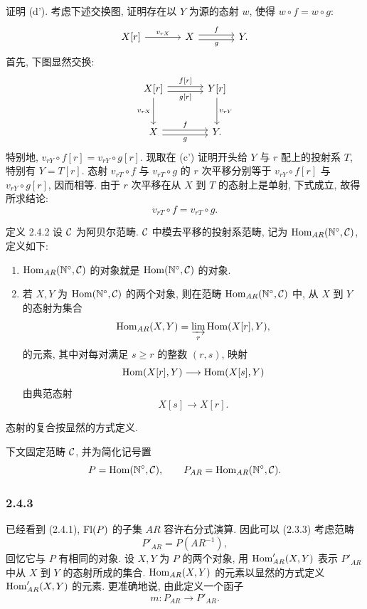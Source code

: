 \begin{prooftext}[证明]
证明 (d'). 考虑下述交换图, 证明存在以 $Y$ 为源的态射 $w$, 使得 $w\circ f=w\circ g$:
\[
\begin{tikzcd}[column sep=large]
X[r] \arrow[r,"{v_{rX}}"] & X \arrow[r,shift left,"f"] \arrow[r,shift right,"g"'] & Y .
\end{tikzcd}
\]
首先, 下图显然交换:
\[
\begin{tikzcd}[column sep=large,row sep=large]
X[r] \arrow[r,shift left,"{f[r]}"] \arrow[r,shift right,"{g[r]}"'] \arrow[d,"{v_{rX}}"'] & Y[r] \arrow[d,"{v_{rY}}"]\\
X \arrow[r,shift left,"f"] \arrow[r,shift right,"g"'] & Y .
\end{tikzcd}
\]
特别地, $v_{rY}\circ f[r]=v_{rY}\circ g[r]$. 现取在 (c') 证明开头给 $Y$ 与 $r$ 配上的投射系 $T$, 特别有 $Y=T[r]$. 态射 $v_{rT}\circ f$ 与 $v_{rT}\circ g$ 的 $r$ 次平移分别等于 $v_{rY}\circ f[r]$ 与 $v_{rY}\circ g[r]$, 因而相等. 由于 $r$ 次平移在从 $X$ 到 $T$ 的态射上是单射, 下式成立, 故得所求结论:
\[
v_{rT}\circ f=v_{rT}\circ g.
\]
\end{prooftext}

\begin{statement}{定义 2.4.2}
设 $\mathcal C$ 为阿贝尔范畴. $\mathcal C$ 中模去平移的投射系范畴, 记为 $\operatorname{Hom}_{AR}(\mathbb N^\circ,\mathcal C)$, 定义如下:
\begin{enumerate}[label=(\roman*)]
\item $\operatorname{Hom}_{AR}(\mathbb N^\circ,\mathcal C)$ 的对象就是 $\operatorname{Hom}(\mathbb N^\circ,\mathcal C)$ 的对象.
\item 若 $X,Y$ 为 $\operatorname{Hom}(\mathbb N^\circ,\mathcal C)$ 的两个对象, 则在范畴 $\operatorname{Hom}_{AR}(\mathbb N^\circ,\mathcal C)$ 中, 从 $X$ 到 $Y$ 的态射为集合
\[
\operatorname{Hom}_{AR}(X,Y)=\varinjlim_r\operatorname{Hom}(X[r],Y),
\]
的元素, 其中对每对满足 $s\ge r$ 的整数 $(r,s)$, 映射
\[
\operatorname{Hom}(X[r],Y)\longrightarrow\operatorname{Hom}(X[s],Y)
\]
由典范态射
\[
X[s]\longrightarrow X[r].
\]
\end{enumerate}
态射的复合按显然的方式定义.
\end{statement}
下文固定范畴 $\mathcal C$, 并为简化记号置
\[
P=\operatorname{Hom}(\mathbb N^\circ,\mathcal C),\qquad P_{AR}=\operatorname{Hom}_{AR}(\mathbb N^\circ,\mathcal C).
\]

\subsubsection*{2.4.3}
已经看到 (2.4.1), $\operatorname{Fl}(P)$ 的子集 $AR$ 容许右分式演算. 因此可以 (2.3.3) 考虑范畴
\[
P'_{AR}=P(AR^{-1}),
\]
回忆它与 $P$ 有相同的对象. 设 $X,Y$ 为 $P$ 的两个对象, 用 $\operatorname{Hom}'_{AR}(X,Y)$ 表示 $P'_{AR}$ 中从 $X$ 到 $Y$ 的态射所成的集合. $\operatorname{Hom}_{AR}(X,Y)$ 的元素以显然的方式定义 $\operatorname{Hom}'_{AR}(X,Y)$ 的元素. 更准确地说, 由此定义一个函子
\[
m:P_{AR}\longrightarrow P'_{AR}.
\]

